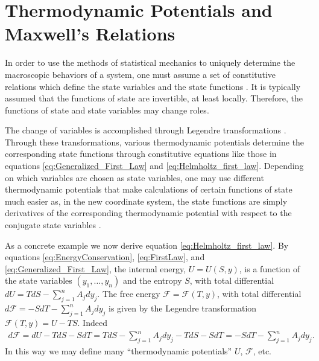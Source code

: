 \documentclass[english,12pt]{ttuthes}
\newcommand{\Fc}{\mathcal{F}}
\begin{document}
%
\section{Thermodynamic Potentials and Maxwell's Relations}
\label{sec:LegendreTransformations}
%
%
In order to use the methods of statistical mechanics to uniquely
determine the macroscopic behaviors of a system, one must assume a
set of constitutive relations which define the state variables and the
state functions \cite{Bobbio-2000}. It is typically assumed that the
functions of state are invertible, at least locally. Therefore, the
functions of state and state variables may change roles.

The change of variables is accomplished through Legendre
transformations \cite{Bobbio-2000,Baker-1990,Robertson-1993}. Through
these transformations, various thermodynamic potentials determine the
corresponding state functions through constitutive equations like
those in equations \eqref{eq:Generalized_First_Law} and
\eqref{eq:Helmholtz_first_law}. Depending on which variables are 
chosen as state variables, one may use different thermodynamic
potentials that make calculations of certain functions of state much
easier as, in the new coordinate system, the state functions are
simply derivatives of the corresponding thermodynamic potential with
respect to the conjugate state variables \cite{Callen-1985}.

As a concrete example we now derive equation
\eqref{eq:Helmholtz_first_law}. By equations
\eqref{eq:EnergyConservation}, \eqref{eq:FirstLaw}, and
\eqref{eq:Generalized_First_Law}, the internal energy, $U=U(S,y)$, is
a function of the state variables $(y_1,\ldots,y_n)$ and the entropy $S$, with total
differential $dU=TdS-\sum_{j=1}^nA_jdy_j$. The free energy
$\Fc=\Fc(T,y)$, with total differential
$d\Fc=-SdT-\sum_{j=1}^nA_jdy_j$ is given by the Legendre transformation
$\Fc(T,y)=U-TS$. Indeed 
% 
\begin{align*}
  d\Fc=dU-TdS-SdT=TdS-\sum_{j=1}^nA_jdy_j-TdS-SdT=-SdT-\sum_{j=1}^nA_jdy_j.
\end{align*}
%
In this way we may define many ``thermodynamic potentials'' $U$,
$\Fc$, etc.
\end{document}
